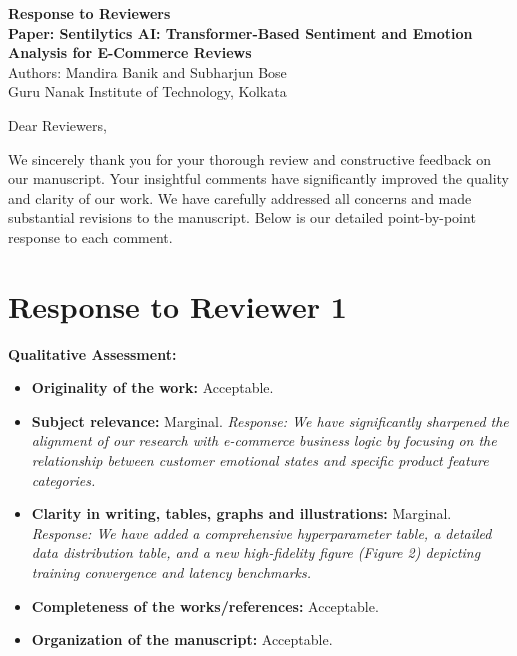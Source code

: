 \documentclass[11pt,a4paper]{article}
\begin{document}
\begin{center}
\textbf{\Large Response to Reviewers}\\
\vspace{6pt}
\textbf{Paper: Sentilytics AI: Transformer-Based Sentiment and Emotion Analysis for E-Commerce Reviews}\\
\vspace{6pt}
Authors: Mandira Banik and Subharjun Bose\\
Guru Nanak Institute of Technology, Kolkata
\end{center}

\vspace{12pt}

\noindent Dear Reviewers,

We sincerely thank you for your thorough review and constructive feedback on our manuscript. Your insightful comments have significantly improved the quality and clarity of our work. We have carefully addressed all concerns and made substantial revisions to the manuscript. Below is our detailed point-by-point response to each comment.

\vspace{12pt}

\section*{Response to Reviewer 1}

\noindent \textbf{Qualitative Assessment:}
\begin{itemize}[leftmargin=*]
    \item \textbf{Originality of the work:} Acceptable.
    \item \textbf{Subject relevance:} Marginal. 
    \textit{Response: We have significantly sharpened the alignment of our research with e-commerce business logic by focusing on the relationship between customer emotional states and specific product feature categories.}
    \item \textbf{Clarity in writing, tables, graphs and illustrations:} Marginal. 
    \textit{Response: We have added a comprehensive hyperparameter table, a detailed data distribution table, and a new high-fidelity figure (Figure 2) depicting training convergence and latency benchmarks.}
    \item \textbf{Completeness of the works/references:} Acceptable.
    \item \textbf{Organization of the manuscript:} Acceptable.
\end{itemize}
\end{document}
